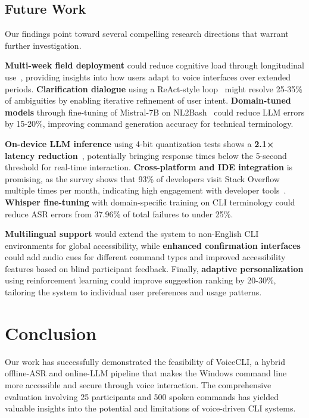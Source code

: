 \documentclass[a4paper,12pt]{article}
\begin{document}
\subsection{Future Work}  
\label{sec:future}  
\noindent Our findings point toward several compelling research directions that warrant further investigation.

\textbf{Multi-week field deployment} could reduce cognitive load through longitudinal use~\cite{ref4}, providing insights into how users adapt to voice interfaces over extended periods. \textbf{Clarification dialogue} using a ReAct-style loop~\cite{ref20} might resolve 25-35\% of ambiguities by enabling iterative refinement of user intent. \textbf{Domain-tuned models} through fine-tuning of Mistral-7B on NL2Bash~\cite{ref26} could reduce LLM errors by 15-20\%, improving command generation accuracy for technical terminology.

\textbf{On-device LLM inference} using 4-bit quantization tests shows a \textbf{2.1× latency reduction}~\cite{ref24}, potentially bringing response times below the 5-second threshold for real-time interaction. \textbf{Cross-platform and IDE integration} is promising, as the survey shows that 93\% of developers visit Stack Overflow multiple times per month, indicating high engagement with developer tools~\cite{ref2}. \textbf{Whisper fine-tuning} with domain-specific training on CLI terminology could reduce ASR errors from 37.96\% of total failures to under 25\%.

\textbf{Multilingual support} would extend the system to non-English CLI environments for global accessibility, while \textbf{enhanced confirmation interfaces} could add audio cues for different command types and improved accessibility features based on blind participant feedback. Finally, \textbf{adaptive personalization} using reinforcement learning could improve suggestion ranking by 20-30\%, tailoring the system to individual user preferences and usage patterns.  
\newpage

\section{Conclusion}  

Our work has successfully demonstrated the feasibility of VoiceCLI, a hybrid offline-ASR and online-LLM pipeline that makes the Windows command line more accessible and secure through voice interaction. The comprehensive evaluation involving 25 participants and 500 spoken commands has yielded valuable insights into the potential and limitations of voice-driven CLI systems.
\end{document}
